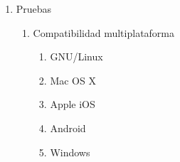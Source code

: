 {\begin{enumerate}
  \begin{enumerate}
    \item Configuraci\'{o}n del sistema operativo
    \begin{enumerate}
      \item RAID
      \item Reducci\'{o}n de componentes instalados
    \end{enumerate}
    \item Configuraci\'{o}n de las herramientas
    \begin{enumerate}
      \item OpenLDAP
      \item OpenSSH
      \item Apache httpd
    \end{enumerate}
    \item Interfaces de usuario
    \begin{enumerate}
      \item Interfaz de administraci\'{o}n
      \item Interfaz de cambio de contrase\~{n}a
    \end{enumerate}
    \item Hardening
    \begin{enumerate}
      \item Sistema operativo
      \begin{enumerate}
        \item Firewall
      \end{enumerate}
      \item Servicios
      \begin{enumerate}
        \item ssh
        \item http
        \item ldap
      \end{enumerate}
    \end{enumerate}
  \end{enumerate}
  \item Pruebas
  \begin{enumerate}
    \item Compatibilidad multiplataforma
    \begin{enumerate}
      \item GNU/Linux
      \item Mac OS X
      \item Apple iOS
      \item Android
      \item Windows

\end{enumerate}
\end{enumerate}
\end{enumerate}}
